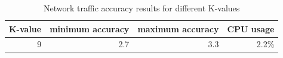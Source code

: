 \begin{table}[ht]
    \centering
    \begin{tabular}{r|rrr}
        K-value & minimum accuracy & maximum accuracy & CPU usage \\ \hline
        9 & 2.7 & 3.3 & 2.2\% \\
        
    \end{tabular}
    \caption{Network traffic accuracy results for different K-values}
    \label{tab:accuracy_results}
\end{table}

